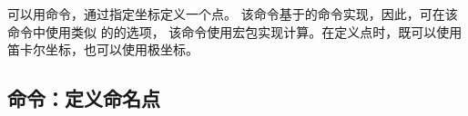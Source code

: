 \documentclass[../main.tex]{subfiles}
\begin{document}
可以用命令，通过指定坐标定义一个点。
该命令基于\TIKZ{}的命令实现，因此，可在该命令中使用类似
的\TIKZ{}的选项，
该命令使用宏包实现计算。在定义点时，既可以使用笛卡尔坐标，也可以使用极坐标。

\subsection{命令：定义命名点}
\end{document}
